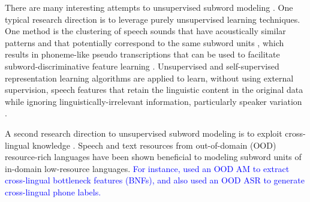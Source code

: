 \documentclass[transmag]{IEEEtran}
\begin{document}
There are many interesting attempts to unsupervised subword modeling \cite{chen2015parallel,heck2017feature,oord2017neural,feng2019_TASLP,Tjandra2019,kahn2019librilight}. One typical research direction is to leverage purely unsupervised learning techniques. One method is the clustering of speech sounds that have acoustically similar patterns and that potentially correspond to the same subword units  \cite{chen2015parallel,ansari2017deep}, which results in phoneme-like pseudo transcriptions that can be used to facilitate subword-discriminative feature learning \cite{chen2015parallel,heck2017feature}.
Unsupervised and self-supervised representation learning algorithms are applied to learn, without using external supervision, speech features that retain the linguistic content in the original data while ignoring linguistically-irrelevant information, particularly speaker variation  \cite{oord2018cpc,oord2017neural,hsu2017nips,last2020unsupervised,Zeghidour+2016}. 


A second research direction to unsupervised subword modeling is to exploit cross-lingual knowledge \cite{shibata2017composite,feng2018exploiting}. Speech and text resources from out-of-domain (OOD) resource-rich languages have been shown beneficial to modeling subword units of in-domain low-resource languages. 
\textcolor{blue}{For instance, \cite{shibata2017composite,feng2018exploiting} used an OOD AM to extract cross-lingual bottleneck features (BNFs), and \cite{feng2018exploiting} also used an OOD ASR to generate cross-lingual phone labels.}

\end{document}

